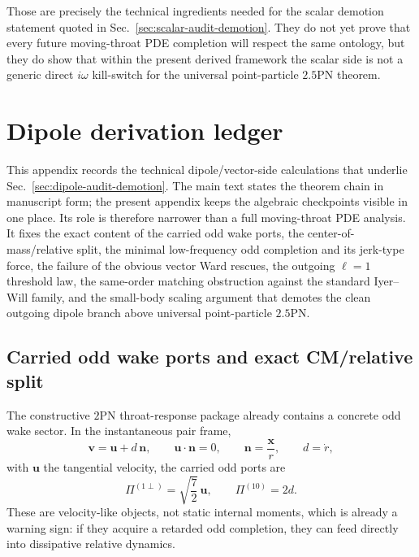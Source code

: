 \documentclass[11pt]{article}
\begin{document}
Those are precisely the technical ingredients needed for the scalar demotion
statement quoted in Sec.~\ref{sec:scalar-audit-demotion}.  They do not yet prove
that every future moving-throat PDE completion will respect the same ontology,
but they do show that within the present derived framework the scalar side is not
a generic direct $i\omega$ kill-switch for the universal point-particle
$2.5$PN theorem.


\section{Dipole derivation ledger}
\label{app:dipole-derivation-ledger}

This appendix records the technical dipole/vector-side calculations that underlie
Sec.~\ref{sec:dipole-audit-demotion}.  The main text states the theorem chain in
manuscript form; the present appendix keeps the algebraic checkpoints visible in
one place.  Its role is therefore narrower than a full moving-throat PDE
analysis.  It fixes the exact content of the carried odd wake ports, the
center-of-mass/relative split, the minimal low-frequency odd completion and its
jerk-type force, the failure of the obvious vector Ward rescues, the outgoing
$\ell=1$ threshold law, the same-order matching obstruction against the
standard Iyer--Will family, and the small-body scaling argument that demotes the
clean outgoing dipole branch above universal point-particle $2.5$PN.

\subsection{Carried odd wake ports and exact CM/relative split}
\label{app:dipole-ledger-ports}

The constructive $2$PN throat-response package already contains a concrete odd
wake sector.  In the instantaneous pair frame,
\[
\mathbf v=\mathbf u+d\,\mathbf n,
\qquad
\mathbf u\cdot\mathbf n=0,
\qquad
\mathbf n=\frac{\mathbf x}{r},
\qquad
 d=\dot r,
\]
with $\mathbf u$ the tangential velocity, the carried odd ports are
\[
\Pi^{(1\perp)}=\sqrt{\frac72}\,\mathbf u,
\qquad
\Pi^{(10)}=2d.
\]
These are velocity-like objects, not static internal moments, which is already a
warning sign: if they acquire a retarded odd completion, they can feed directly
into dissipative relative dynamics.
\end{document}
